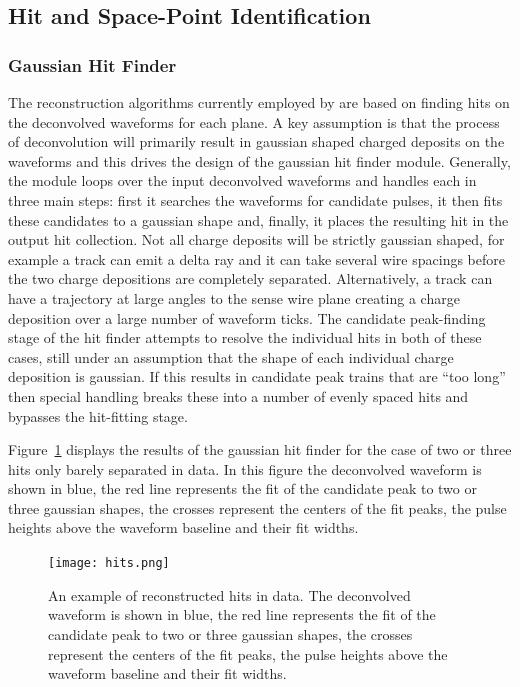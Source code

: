 \subsection{Hit and Space-Point Identification}

\subsubsection{Gaussian Hit Finder}\label{sec:gaushit}

The reconstruction algorithms currently employed by \larsoft are based on finding hits on the deconvolved waveforms for each plane. A key assumption is that the process of deconvolution will primarily result in gaussian shaped charged deposits on the waveforms and this drives the design of the gaussian hit finder module. Generally, the module loops over the input deconvolved waveforms and handles each in three main steps: first it searches the waveforms %
for candidate pulses, it then fits these candidates %
to a gaussian shape and, finally, it places the resulting hit %
in the output hit collection. Not all charge deposits will be strictly gaussian shaped, for example a track can emit a delta ray and it can take several wire spacings before the two charge depositions are %
completely separated. Alternatively, a track can have a trajectory at large angles to the sense wire plane creating a charge deposition over a large number of waveform ticks. The candidate peak-finding stage of the hit finder attempts to resolve the individual hits in both of these cases, still under an assumption that the shape of each individual charge deposition is %
gaussian. If this results in candidate peak trains that are ``too long'' then special handling  breaks these into a number of evenly spaced hits and bypasses the hit-fitting stage. 

Figure~\ref{pDUNE_sp_hits} displays the results of the gaussian hit finder for the case of two or three hits only barely separated in  data. In this figure the deconvolved waveform is shown in blue, the red line represents the fit of the candidate peak to two or three gaussian shapes, the crosses represent the centers of the fit peaks, the pulse heights above the waveform baseline and their fit widths. 
\begin{figure}[!h!tbp]
\centering
\texttt{[image: hits.png]}
\caption[An example of reconstructed hits in  data]{An example of reconstructed hits in  data. The deconvolved waveform is shown in blue, the red line represents the fit of the candidate peak to two or three gaussian shapes, the crosses represent the centers of the fit peaks, the pulse heights above the waveform baseline and their fit widths.
}
\label{pDUNE_sp_hits}
\end{figure}

